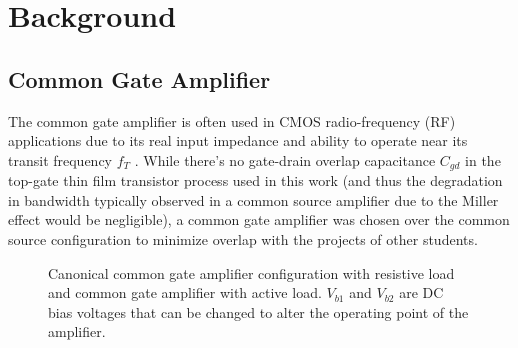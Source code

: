 \documentclass[conference]{IEEEtran}
\begin{document}
\section{Background}

\subsection{Common Gate Amplifier}

The common gate amplifier is often used in CMOS radio-frequency (RF) applications due to its real input impedance and ability to operate near its transit frequency $f_T$ \cite{Razavi}.
While there's no gate-drain overlap capacitance $C_{gd}$ in the top-gate thin film transistor process used in this work
(and thus the degradation in bandwidth typically observed in a common source amplifier due to the Miller effect would be negligible),
a common gate amplifier was chosen over the common source configuration to minimize overlap with the projects of other students.

\begin{figure}[htbp]
    \centering
    \quad
    \caption{Canonical common gate amplifier configuration with resistive load and common gate amplifier with active load. $V_{b1}$ and $V_{b2}$ are DC bias voltages that can be changed to alter the operating point of the amplifier.}
    \label{fig:commongate}
\end{figure}
\end{document}
